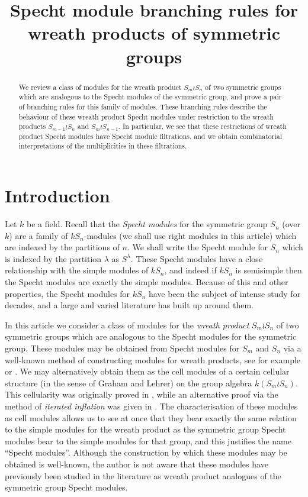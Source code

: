 \documentclass[ALCO,Unicode,published]{cedram}
\title[Specht branching rules for wreath products]{Specht module branching rules for wreath products of symmetric groups}
\author[\initial{R.} Green]{\firstname{Reuben} \lastname{Green}}
\begin{document}
\begin{abstract}
We review a class of modules for the wreath product $S_m \wr S_n$ of two symmetric groups which are analogous to the Specht modules
of the symmetric group, and prove a pair of branching rules for this family of modules. These branching rules describe the behaviour
of these wreath product Specht modules under restriction to the wreath products $S_{m-1} \wr S_n$ and $S_m \wr S_{n-1}$. In particular, we
see that these restrictions of wreath product Specht modules have Specht module filtrations, and we obtain combinatorial interpretations
of the multiplicities in these filtrations.
\end{abstract}

\maketitle

\section{Introduction}
Let $k$ be a field. Recall that the \textit{Specht modules} for the symmetric group $S_n$ (over $k$) are a family of $kS_n$-modules
(we shall use right modules in this article) which are indexed by the partitions of $n$. We shall write the Specht module for $S_n$ which
is indexed by the partition $\lambda$ as $S^\lambda$. These Specht modules have a close relationship with the simple modules of
$kS_n$, and indeed if $kS_n$ is semisimple then the Specht modules are exactly the simple modules. Because of this and other properties,
the Specht modules for $kS_n$ have been the subject of intense study for decades, and a large and varied literature has built up around
them.

In this article we consider a class of modules for the \textit{wreath product} $S_m \wr S_n$ of two symmetric groups which are
analogous to the Specht modules for the symmetric group. These modules may be obtained from Specht modules for $S_m$ and $S_n$ via
a well-known method of constructing modules for wreath products, see for example \cite{CHTAN} or \cite[chapter 4]{JAMKER}.
We may alternatively obtain them as the cell modules of a certain cellular structure (in the sense of Graham and Lehrer) on the group
algebra $k(S_m \wr S_n)$. This cellularity was originally proved in \cite{GEGO}, while an alternative proof via the method of
\textit{iterated inflation} was given in \cite{GCSWPA}. The characterisation of these modules as cell modules
allows us to see at once that they bear exactly the same relation to the simple modules for the wreath product as the symmetric group
Specht modules bear to the simple modules for that group, and this justifies the name ``Specht modules''. Although the construction by
which these modules may be obtained is well-known, the author is not aware that these modules have previously been studied in the
literature as wreath product analogues of the symmetric group Specht modules.
\end{document}
